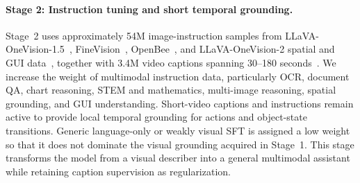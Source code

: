 
\paragraph{Stage 2: Instruction tuning and short temporal grounding.}
Stage~2 uses approximately 54M image-instruction samples from LLaVA-OneVision-1.5~\citep{li2024llavaonevision15}, FineVision~\citep{finevision25m}, OpenBee~\citep{zhang2026beehighqualitycorpusfullstack}, and LLaVA-OneVision-2 spatial and GUI data~\citep{llavaonevision2}, together with 3.4M video captions spanning 30--180 seconds~\citep{llavaonevision2}. We increase the weight of multimodal instruction data, particularly OCR, document QA, chart reasoning, STEM and mathematics, multi-image reasoning, spatial grounding, and GUI understanding. Short-video captions and instructions remain active to provide local temporal grounding for actions and object-state transitions. Generic language-only or weakly visual SFT is assigned a low weight so that it does not dominate the visual grounding acquired in Stage~1. This stage transforms the model from a visual describer into a general multimodal assistant while retaining caption supervision as regularization.



